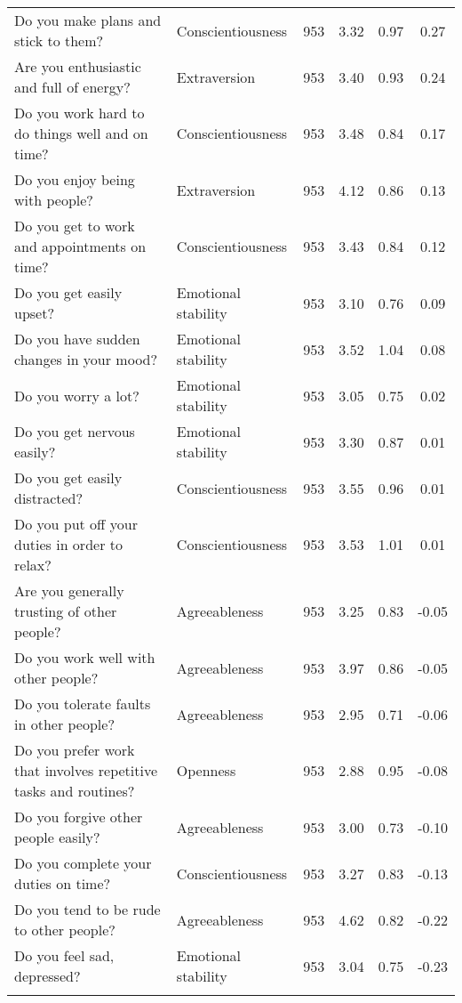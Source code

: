 \begin{table}[htbp]
{\begin{tabular}{llcccc}
    Do you make plans and stick to them? & Conscientiousness & 953   & 3.32  & 0.97  & 0.27 \\
    Are you enthusiastic and full of energy? & Extraversion & 953   & 3.40  & 0.93  & 0.24 \\
    Do you work hard to do things well and on time? & Conscientiousness & 953   & 3.48  & 0.84  & 0.17 \\
    Do you enjoy being with people? & Extraversion & 953   & 4.12  & 0.86  & 0.13 \\
    Do you get to work and appointments on time? & Conscientiousness & 953   & 3.43  & 0.84  & 0.12 \\
    Do you get easily upset? & Emotional stability & 953   & 3.10  & 0.76  & 0.09 \\
    Do you have sudden changes in your mood? & Emotional stability & 953   & 3.52  & 1.04  & 0.08 \\
    Do you worry a lot? & Emotional stability & 953   & 3.05  & 0.75  & 0.02 \\
    Do you get nervous easily? & Emotional stability & 953   & 3.30  & 0.87  & 0.01 \\
    Do you get easily distracted? & Conscientiousness & 953   & 3.55  & 0.96  & 0.01 \\
    Do you put off your duties in order to relax? & Conscientiousness & 953   & 3.53  & 1.01  & 0.01 \\
    Are you generally trusting of other people? & Agreeableness & 953   & 3.25  & 0.83  & -0.05 \\
    Do you work well with other people? & Agreeableness & 953   & 3.97  & 0.86  & -0.05 \\
    Do you tolerate faults in other people? & Agreeableness & 953   & 2.95  & 0.71  & -0.06 \\
    Do you prefer work that involves repetitive tasks and routines? & Openness & 953   & 2.88  & 0.95  & -0.08 \\
    Do you forgive other people easily? & Agreeableness & 953   & 3.00  & 0.73  & -0.10 \\
    Do you complete your duties on time? & Conscientiousness & 953   & 3.27  & 0.83  & -0.13 \\
    Do you tend to be rude to other people? & Agreeableness & 953   & 4.62  & 0.82  & -0.22 \\
    Do you feel sad, depressed? & Emotional stability & 953   & 3.04  & 0.75  & -0.23 \\
    \bottomrule
	\Tablenote{6}{Most contributive variables (represented with \textbf{bold font}) are used to interpret factor.} \\
    \end{tabular}%
	}
  \label{tab:factor1}%
\end{table}%
